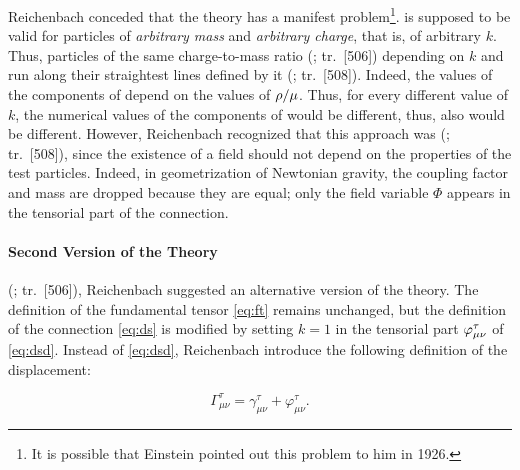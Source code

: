 \documentclass[submitted]{article}
\newcommand{\ctmr}{charge-to-mass ratio\xspace}
\newcommand{\ctmrd}{\ensuremath{\hfrac{\rho}{\mu}}\xspace}
\renewcommand{\rzlap}[2]{(\cite[#1]{Reichenbach1928}; tr.\ [#2])\xspace}
\begin{document}

Reichenbach conceded that the theory has a manifest problem\footnote{It is possible that Einstein pointed out this problem to him in 1926. }.  is supposed to be valid for particles of \emph{arbitrary mass} and \emph{arbitrary charge}, that is, of arbitrary $k$. Thus, particles of the same \ctmr {} \rzlap{362}{506} depending on $k$ and run along their  straightest lines defined by it \rzlap{363}{508}. Indeed, the values of the components of \Gtmn depend on the values of \ctmrd. Thus, for every different value of $k$, the numerical values of the components of \Gtmn would be different, thus, also \ritea would be different. However, Reichenbach recognized that this approach was  \rzlap{363}{508}, since the existence of a field should not depend on the properties of the test particles. Indeed, in  geometrization of Newtonian gravity, the coupling factor and mass are dropped because they are equal; only the field variable $\Phi$ appears in the tensorial part of the connection.

\paragraph{Second Version of the Theory}
\label{RTt}

 \rzlap{367}{506}, Reichenbach suggested an alternative version of the theory. The definition of the fundamental tensor \cref{eq:ft} remains unchanged, but the definition of the connection \cref{eq:ds} is modified by setting $k=1$ in the tensorial part $\varphi^\tau_{\mu\nu}$ of \cref{eq:dsd}. Instead of \cref{eq:dsd}, Reichenbach introduce the following definition of the displacement:

\begin{equation*}
\Gamma_{\mu \nu}^{\tau}=\gamma_{\mu \nu}^{\tau}+\varphi_{\mu \nu}^{\tau}.
\end{equation*}
\end{document}
